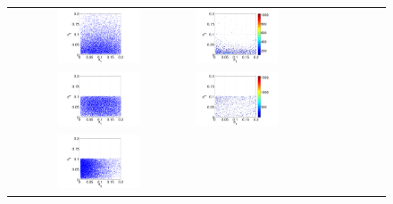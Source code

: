 \documentclass[review,12pt]{elsarticle}
\begin{document}
 \begin{figure}[ht]
        \begin{tabular}{clc}
\includegraphics[width=0.475\textwidth]{Figure16a.pdf} &
\includegraphics[width=0.475\textwidth]{Figure16b.pdf} \\
\includegraphics[width=0.475\textwidth]{Figure16c.pdf} &
\includegraphics[width=0.475\textwidth]{Figure16d.pdf} \\
\includegraphics[width=0.475\textwidth]{Figure16e.pdf} &

\end{tabular}
\end{figure}
\end{document}
